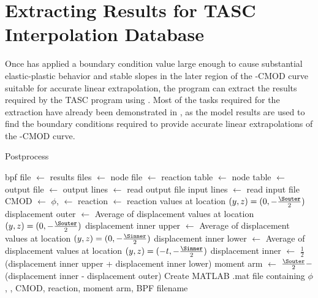 \section{Extracting Results for TASC Interpolation Database}
\label{sec:postprocess}

Once  has applied a boundary condition value large enough to cause substantial elastic-plastic behavior and stable slopes in the later region of the \J-CMOD curve suitable for accurate linear extrapolation, the program can extract the results required by the TASC program using .
Most of the tasks required for the extraction have already been demonstrated in , as the model results are used to find the boundary conditions required to provide accurate linear extrapolations of the \J-CMOD curve.

\begin{algorithm}[tbp]
  \caption{Postprocess}
  \label{alg:postprocess}
  \begin{algorithmic}
    \State bpf file $\gets$ 
    \State results files $\gets$ 
    \State {}
    \State node file $\gets$ 
    \State reaction table $\gets$ 
    \State node table $\gets$ 
    \State output file $\gets$ 
    \State output lines $\gets$ read output file
    \State input lines $\gets$ read input file
	\State CMOD $\gets$ 
	\State $\phi$, \J $\gets$ 
	\State reaction $\gets$ reaction values at location $(y, z) = (0, -\frac{\Souter}{2})$
	\State {}
	\State displacement outer $\gets$ Average of displacement values at location $(y, z) = (0, -\frac{\Souter}{2})$
	\State {}
	\State displacement inner upper $\gets$ Average of displacement values at location $(y, z) = (0, -\frac{\Sinner}{2})$
	\State displacement inner lower $\gets$ Average of displacement values at location $(y, z) = (-t, -\frac{\Sinner}{2})$
	\State {}
	\State displacement inner $\gets$ $\frac{1}{2}$(displacement inner upper + displacement inner lower)
	\State moment arm $\gets$ $\frac{\Souter}{2} -$ (displacement inner - displacement outer)
	\State {}
	\State Create MATLAB .mat file containing $\phi$, \J, CMOD, reaction, moment arm, BPF filename
    \EndProcedure
  \end{algorithmic}
\end{algorithm}
